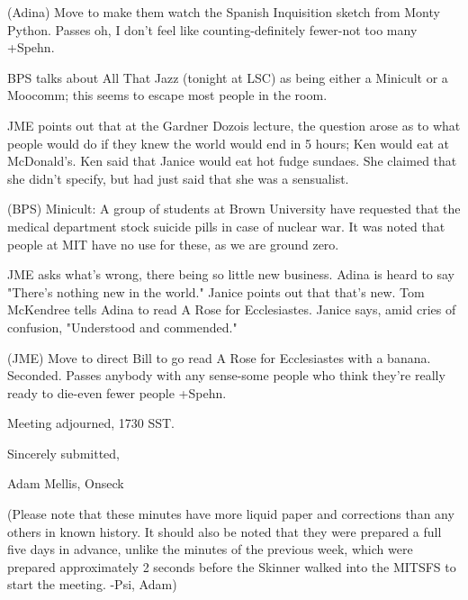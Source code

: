\documentclass[12pt]{article}
\begin{document}
(Adina) Move to make them watch the Spanish Inquisition sketch from Monty Python. Passes oh, I don't feel like counting-definitely fewer-not too many +Spehn.

BPS talks about All That Jazz (tonight at LSC) as being either a Minicult or a Moocomm; this seems to escape most people in the room.

JME points out that at the Gardner Dozois lecture, the question arose as to what people would do if they knew the world would end in 5 hours; Ken would eat at McDonald's. Ken said that Janice would eat hot fudge sundaes. She claimed that she didn't specify, but had just said that she was a sensualist.

(BPS) Minicult: A group of students at Brown University have requested that the medical department stock suicide pills in case of nuclear war. It was noted that people at MIT have no use for these, as we are ground zero.

JME asks what's wrong, there being so little new business. Adina is heard to say "There's nothing new in the world." Janice points out that that's new. Tom McKendree tells Adina to read A Rose for Ecclesiastes. Janice says, amid cries of confusion, "Understood and commended."

(JME) Move to direct Bill to go read A Rose for Ecclesiastes with a banana. Seconded. Passes anybody with any sense-some people who think they're really ready to die-even fewer people +Spehn.

\vspace{12pt}

\noindent
Meeting adjourned, 1730 SST.

\vspace{18pt}

\centerline{Sincerely submitted,}
\centerline{Adam Mellis, Onseck}

(Please note that these minutes have more liquid paper and corrections than any others in known history. It should also be noted that they were prepared a full five days in advance, unlike the minutes of the previous week, which were prepared approximately 2 seconds before the Skinner walked into the MITSFS to start the meeting. -Psi, Adam)
\end{document}
